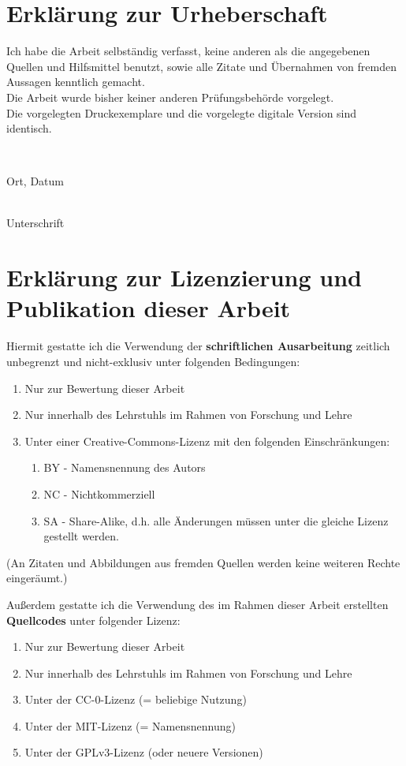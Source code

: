 \section*{Erklärung zur Urheberschaft}
Ich habe die Arbeit selbständig verfasst, keine anderen als die angegebenen Quellen und Hilfsmittel benutzt, sowie alle Zitate und Übernahmen von fremden Aussagen kenntlich gemacht.\\
Die Arbeit wurde bisher keiner anderen Prüfungsbehörde vorgelegt.\\
Die vorgelegten Druckexemplare und die vorgelegte digitale Version sind identisch.\\


\vspace{55pt}
\null\parbox{5.5cm}{\hrulefill\\\raggedright Ort, Datum}
\null\hfill\parbox{5.5cm}{\hrulefill\\\raggedleft Unterschrift}

\clearpage

\section*{Erklärung zur Lizenzierung und Publikation dieser Arbeit}
Hiermit gestatte ich die Verwendung der \textbf{schriftlichen Ausarbeitung} zeitlich unbegrenzt und nicht-exklusiv unter folgenden Bedingungen:

\begin{enumerate}[noitemsep]
	\item[\Square] Nur zur Bewertung dieser Arbeit
	\item[\Square] Nur innerhalb des Lehrstuhls im Rahmen von Forschung und Lehre
	\item[\XBox] Unter einer Creative-Commons-Lizenz mit den folgenden Einschränkungen:
	\begin{enumerate}[noitemsep]
		\item[\XBox] BY - Namensnennung des Autors
		\item[\Square] NC - Nichtkommerziell
		\item[\Square] SA - Share-Alike, d.h. alle Änderungen müssen unter die gleiche Lizenz gestellt werden.
	\end{enumerate}
\end{enumerate}

{
	\noindent\footnotesize (An Zitaten und Abbildungen aus fremden Quellen werden keine weiteren Rechte eingeräumt.)\\
}

\noindent Außerdem gestatte ich die Verwendung des im Rahmen dieser Arbeit erstellten \textbf{Quellcodes} unter folgender Lizenz:
\begin{enumerate}[noitemsep]
	\item[\Square] Nur zur Bewertung dieser Arbeit
	\item[\Square] Nur innerhalb des Lehrstuhls im Rahmen von Forschung und Lehre
	\item[\Square] Unter der CC-0-Lizenz (= beliebige Nutzung)
	\item[\XBox] Unter der MIT-Lizenz (= Namensnennung)
	\item[\Square] Unter der GPLv3-Lizenz (oder neuere Versionen)
\end{enumerate}


